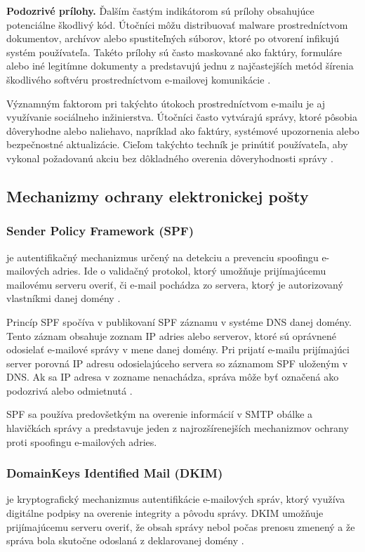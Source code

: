 \documentclass[conference]{IEEEtran}
\begin{document}
\textbf{Podozrivé prílohy.}
Ďalším častým indikátorom sú prílohy obsahujúce potenciálne
škodlivý kód. Útočníci môžu distribuovať malware prostredníctvom
dokumentov, archívov alebo spustiteľných súborov, ktoré po otvorení
infikujú systém používateľa. Takéto prílohy sú často maskované
ako faktúry, formuláre alebo iné legitímne dokumenty a predstavujú
jednu z najčastejších metód šírenia škodlivého softvéru prostredníctvom
e-mailovej komunikácie \cite{verma2017phishing}.

Významným faktorom pri takýchto útokoch prostredníctvom e-mailu
je aj využívanie sociálneho inžinierstva. Útočníci často vytvárajú
správy, ktoré pôsobia dôveryhodne alebo naliehavo, napríklad
ako faktúry, systémové upozornenia alebo bezpečnostné
aktualizácie. Cieľom takýchto techník je prinútiť používateľa,
aby vykonal požadovanú akciu bez dôkladného overenia
dôveryhodnosti správy \cite{aurangzeb2017ransomware}. 

\subsection{Mechanizmy ochrany elektronickej pošty}

\subsubsection*{Sender Policy Framework (SPF)}

je autentifikačný mechanizmus
určený na detekciu a prevenciu spoofingu e-mailových adries.
Ide o validačný protokol, ktorý umožňuje prijímajúcemu
mailovému serveru overiť, či e-mail pochádza zo servera,
ktorý je autorizovaný vlastníkmi danej domény
\cite{karim2019spam}.

Princíp SPF spočíva v publikovaní SPF záznamu v systéme
DNS danej domény. Tento záznam obsahuje zoznam IP adries
alebo serverov, ktoré sú oprávnené odosielať e-mailové
správy v mene danej domény. Pri prijatí e-mailu prijímajúci
server porovná IP adresu odosielajúceho servera so záznamom
SPF uloženým v DNS. Ak sa IP adresa v zozname nenachádza,
správa môže byť označená ako podozrivá alebo odmietnutá
\cite{rfc7208}.

SPF sa používa predovšetkým na overenie informácií v SMTP
obálke a hlavičkách správy a predstavuje jeden z najrozšírenejších
mechanizmov ochrany proti spoofingu e-mailových adries\cite{karim2019spam}.

\subsubsection*{DomainKeys Identified Mail (DKIM)}
 je kryptografický
mechanizmus autentifikácie e-mailových správ, ktorý využíva
digitálne podpisy na overenie integrity a pôvodu správy.
DKIM umožňuje prijímajúcemu serveru overiť, že obsah
správy nebol počas prenosu zmenený a že správa bola
skutočne odoslaná z deklarovanej domény
\cite{rfc6376}.
\end{document}
